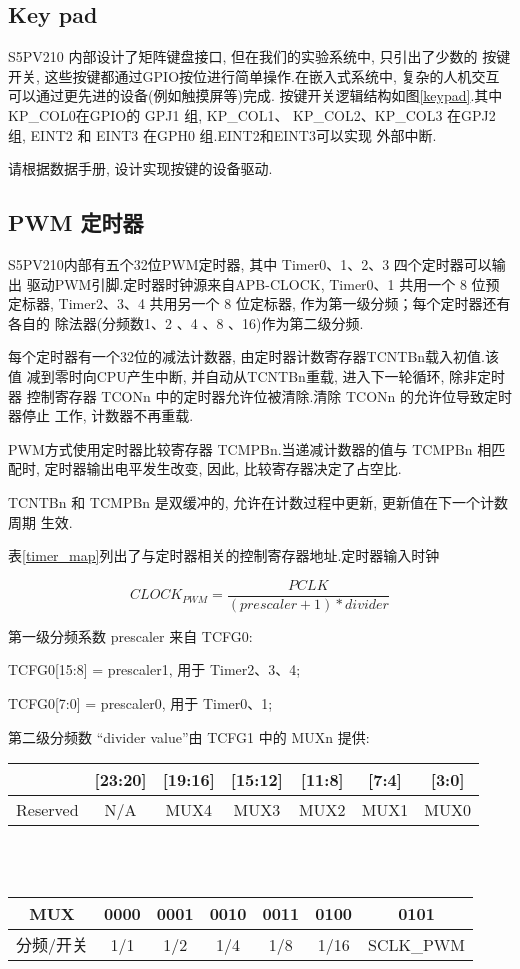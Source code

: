 \subsection{Key pad}
	S5PV210 内部设计了矩阵键盘接口, 但在我们的实验系统中, 只引出了少数的
按键开关, 这些按键都通过GPIO按位进行简单操作.在嵌入式系统中, 复杂的人机交互
可以通过更先进的设备(例如触摸屏等)完成.
按键开关逻辑结构如图\ref{keypad}.其中 KP\_COL0在GPIO的 GPJ1 组, KP\_COL1、
KP\_COL2、KP\_COL3 在GPJ2 组, EINT2 和 EINT3 在GPH0 组.EINT2和EINT3可以实现
外部中断.

	请根据数据手册, 设计实现按键的设备驱动.

\subsection{PWM 定时器}
	S5PV210内部有五个32位PWM定时器, 其中 Timer0、1、2、3 四个定时器可以输出
驱动PWM引脚.定时器时钟源来自APB-CLOCK, Timer0、1 共用一个 8 位预定标器,
Timer2、3、4 共用另一个 8 位定标器, 作为第一级分频；每个定时器还有各自的
除法器(分频数1、2 、4 、8 、16)作为第二级分频.

	每个定时器有一个32位的减法计数器, 由定时器计数寄存器TCNTBn载入初值.该值
减到零时向CPU产生中断, 并自动从TCNTBn重载, 进入下一轮循环, 除非定时器
控制寄存器 TCONn 中的定时器允许位被清除.清除 TCONn 的允许位导致定时器停止
工作, 计数器不再重载.

	PWM方式使用定时器比较寄存器 TCMPBn.当递减计数器的值与 TCMPBn 相匹配时, 
定时器输出电平发生改变, 因此, 比较寄存器决定了占空比.

	TCNTBn 和 TCMPBn 是双缓冲的, 允许在计数过程中更新, 更新值在下一个计数周期
生效.

	表\ref{timer_map}列出了与定时器相关的控制寄存器地址.定时器输入时钟

$$ CLOCK_{PWM} = \frac{PCLK}{(prescaler+1)*divider} $$

第一级分频系数 prescaler 来自 TCFG0:

	TCFG0[15:8] = prescaler1, 用于 Timer2、3、4;

	TCFG0[7:0] = prescaler0, 用于 Timer0、1;

	第二级分频数 ``divider value''由 TCFG1 中的 MUXn 提供:

\begin{center}
\begin{tabular}{|c|c|c|c|c|c|c|}
\hline
  [31:24] & [23:20] & [19:16] & [15:12] & [11:8] & [7:4] & [3:0] \\\hline
  Reserved & N/A & MUX4 & MUX3 & MUX2 & MUX1 & MUX0 \\\hline
\end{tabular}
 \ \\ \ \\

\begin{tabular}{|c|c|c|c|c|c|c|}
\hline
    MUX &  0000 & 0001 & 0010 & 0011 & 0100 & 0101 \\\hline
	分频/开关 &1/1 & 1/2 & 1/4 & 1/8 & 1/16 & SCLK\_PWM \\\hline
\end{tabular}
\end{center}

